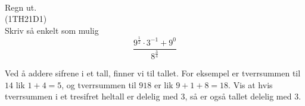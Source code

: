 \\[12pt]


Regn ut.\os
{} \\[10pt]
\newpage
{} 
(1TH21D1) \\%
Skriv så enkelt som mulig
\[ \frac{9^{\frac{1}{2}}\cdot 3^{-1}+9^0}{8^{\frac{3}{4}}} \]

Ved å addere sifrene i et tall, finner vi  til tallet. For eksempel er tverrsummen til $ 14 $ lik $ 1+4=5 $, og tverrsummen til $ 918 $ er lik $ 9+1+8=18 $. Vis at hvis tverrsummen i et tresifret heltall er delelig med 3, så er også tallet delelig med 3.\vsk




